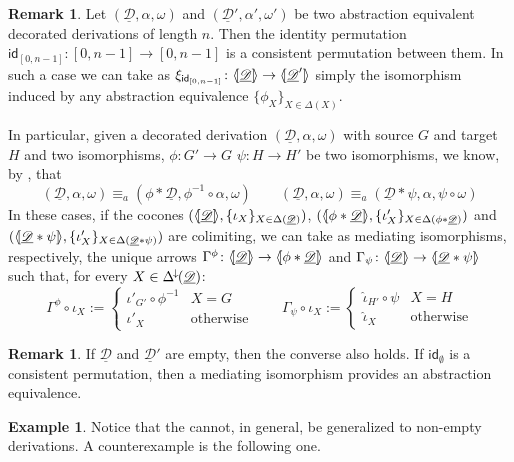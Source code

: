 \documentclass[a4paper]{article}
\newcommand{\Deltamin}{\Delta^{\hspace{-1pt}\downarrow\hspace{-1pt}}}
\newcommand{\id}[1]{\mathsf{id}_{#1}}
\newcommand{\dder}[1]{\mathscr{#1}}
\newcommand{\der}[1]{\underline{\dder{#1}}}
\newcommand{\lpro}{\langle \hspace{-1.85pt}[}
\newcommand{\rpro}{]\hspace{-1.85pt}\rangle}
\newcommand{\tpro}[1]{\lpro \der{#1}\rpro}
\theoremstyle{definition}
\newtheorem{remark}[theorem]{Remark}
\newtheorem{example}[theorem]{Example}
\begin{document}
\begin{remark} \label{rem:abscons}Let $(\der{D}, \alpha, \omega)$ and $(\der{D}', \alpha', \omega')$ be two abstraction equivalent decorated derivations of length $n$. Then the identity permutation $\id{[0,n-1]}\colon [0,n-1]\to [0,n-1]$ is a consistent permutation between them. In such a case we can take as $\xi_{\id{[0,n-1]}}\colon \tpro{D}\to \lpro \der{D}'\rpro$ simply the isomorphism induced by any abstraction equivalence $\{\phi_X\}_{X\in \Delta(X)}$.
	
In particular, given a decorated derivation $(\der{D}, \alpha, \omega)$ with source $G$ and target $H$ and two isomorphisms, $\phi\colon G'\to G$ $\psi\colon H\to H'$ be two isomorphisms, we know, by , that \[(\der{D}, \alpha, \omega)\equiv_a (\phi*\der{D}, \phi^{-1}\circ \alpha, \omega ) \qquad (\der{D}, \alpha, \omega)\equiv_a (\der{D}*\psi, \alpha, \psi \circ \omega )\]
In these cases, if the cocones $(\tpro{D}, \{\iota_X\}_{X\in \Delta(\der{D})})$, $(\lpro \phi *\der{D} \rpro, \{\iota'_X\}_{X\in \Delta(\phi *\der{D})})$ and $(\lpro \der{D}*\psi \rpro, \{\iota'_X\}_{X\in \Delta(\der{D}*\psi)})$ are colimiting, we can take as mediating isomorphisms, respectively, the unique arrows $\Gamma^{\phi} \colon \tpro{D}\to \lpro \phi*\der{D} \rpro$ and $\Gamma_\psi\colon \tpro{D}\to \lpro \der{D}*\psi \rpro$  such that, for every $X\in \Deltamin(\der{D})$:
\[\Gamma^\phi \circ \iota_X:=\begin{cases}
\iota'_{G'}\circ \phi^{-1}  & X=G\\
\iota'_X & \text{otherwise}
\end{cases} \qquad \Gamma_\psi \circ \iota_X:=\begin{cases}
\hat{\iota}_{H'}\circ \psi  & X=H\\
\hat{\iota}_X & \text{otherwise}
\end{cases}\]
\end{remark}


\begin{remark}\label{ex:empty}
	If $\der{D}$ and $\der{D}'$ are empty, then the converse also holds. If $\id{\emptyset}$ is a consistent permutation, then a mediating isomorphism provides an abstraction equivalence.
\end{remark}

\begin{example}Notice that the  cannot, in general, be generalized to non-empty derivations. A counterexample is the following one.
\end{example}
\end{document}
